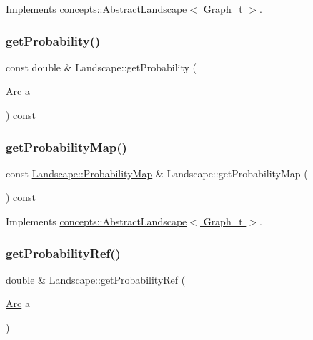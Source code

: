 Implements \hyperlink{classconcepts_1_1_abstract_landscape_a7ed478b62e37cad9a22bed3adedf07c5}{concepts\+::\+Abstract\+Landscape$<$ Graph\+\_\+t $>$}.

\mbox{\label{class_landscape_ac251ee7350a51502a1006333894082c3}} 
\subsubsection{\texorpdfstring{get\+Probability()}{getProbability()}}
{\footnotesize\ttfamily const double \& Landscape\+::get\+Probability (\begin{DoxyParamCaption}\item[{\hyperlink{classconcepts_1_1_abstract_landscape_a0966623f028fe50ac9a3ae114dcf2672}{Arc}}]{a }\end{DoxyParamCaption}) const}

\mbox{\label{class_landscape_a771053b32bbcb6a3fa5204b8bdb53a6d}} 
\subsubsection{\texorpdfstring{get\+Probability\+Map()}{getProbabilityMap()}}
{\footnotesize\ttfamily const \hyperlink{classconcepts_1_1_abstract_landscape_ae90ffb759facff21b29e646539352182}{Landscape\+::\+Probability\+Map} \& Landscape\+::get\+Probability\+Map (\begin{DoxyParamCaption}{ }\end{DoxyParamCaption}) const\hspace{0.3cm}{\ttfamily [virtual]}}



Implements \hyperlink{classconcepts_1_1_abstract_landscape_a4ecbe83965a5266a3a2fa14e201c5871}{concepts\+::\+Abstract\+Landscape$<$ Graph\+\_\+t $>$}.

\mbox{\label{class_landscape_a1d8000badf88704d19ce276743e67a25}} 
\subsubsection{\texorpdfstring{get\+Probability\+Ref()}{getProbabilityRef()}}
{\footnotesize\ttfamily double \& Landscape\+::get\+Probability\+Ref (\begin{DoxyParamCaption}\item[{\hyperlink{classconcepts_1_1_abstract_landscape_a0966623f028fe50ac9a3ae114dcf2672}{Arc}}]{a }\end{DoxyParamCaption})}

